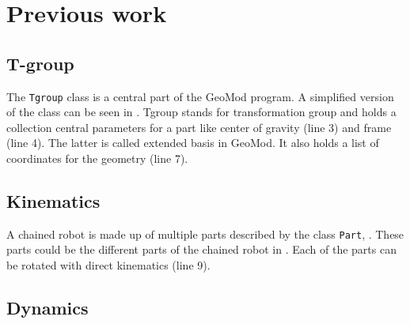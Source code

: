 \chapter{Previous work}\label{previous_work}


\section{T-group}



The \texttt{Tgroup} class is a central part of the GeoMod program. A simplified version of the class can be seen in . Tgroup stands for transformation group and holds a collection central parameters for a part like center of gravity (line 3) and frame (line 4). The latter is called extended basis in GeoMod. It also holds a list of coordinates for the geometry (line 7).

\label{Tgroup}


\section{Kinematics}


A chained robot is made up of multiple parts described by the class \texttt{Part}, . These parts could be the different parts of the chained robot in . Each of the parts can be rotated with direct kinematics (line 9).


\label{Part}


\section{Dynamics}
